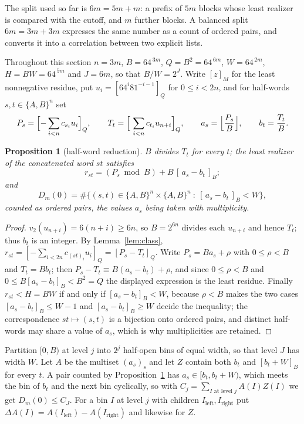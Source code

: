 \documentclass[11pt,a4paper]{article}
\theoremstyle{plain}
\newtheorem{proposition}[theorem]{Proposition}
\theoremstyle{definition}
\theoremstyle{remark}
\begin{document}
The split used so far is $6m=5m+m$: a prefix of $5m$ blocks whose least
realizer is compared with the cutoff, and $m$ further blocks. A balanced split
$6m=3m+3m$ expresses the same number as a count of ordered pairs, and converts
it into a correlation between two explicit lists.

Throughout this section $n=3m$, $B=64^{\,3m}$, $Q=B^{2}=64^{\,6m}$,
$W=64^{\,2m}$, $H=BW=64^{\,5m}$ and $J=6m$, so that $B/W=2^{J}$. Write
$[z]_M$ for the least nonnegative residue, put $u_i=[64^{i}81^{-i-1}]_Q$ for
$0\le i<2n$, and for half-words $s,t\in\{A,B\}^{n}$ set
\[
P_s=\Bigl[-\sum_{i<n}c_{s_i}u_i\Bigr]_Q,\qquad
T_t=\Bigl[\ \sum_{i<n}c_{t_i}u_{n+i}\Bigr]_Q,\qquad
a_s=\Bigl\lfloor \frac{P_s}{B}\Bigr\rfloor,\qquad b_t=\frac{T_t}{B}.
\]

\begin{proposition}[half-word reduction]\label{prop:halfword}
$B$ divides $T_t$ for every $t$; the least realizer of the concatenated word
$st$ satisfies
\[
r_{st}=(P_s\bmod B)+B\,[\,a_s-b_t\,]_B ;
\]
and
\[
D_m(0)=\#\bigl\{(s,t)\in\{A,B\}^{n}\times\{A,B\}^{n}\ :\ [\,a_s-b_t\,]_B<W\bigr\},
\]
counted as ordered pairs, the values $a_s$ being taken with multiplicity.
\end{proposition}

\begin{proof}
$v_2(u_{n+i})=6(n+i)\ge6n$, so $B=2^{6n}$ divides each $u_{n+i}$ and hence
$T_t$; thus $b_t$ is an integer. By Lemma~\ref{lem:class},
$r_{st}=[-\sum_{i<2n}c_{(st)_i}u_i]_Q=[P_s-T_t]_Q$. Write $P_s=Ba_s+\rho$ with
$0\le\rho<B$ and $T_t=Bb_t$; then $P_s-T_t\equiv B(a_s-b_t)+\rho$, and since
$0\le\rho<B$ and $0\le B[a_s-b_t]_B<B^{2}=Q$ the displayed expression is the
least residue. Finally $r_{st}<H=BW$ if and only if $[a_s-b_t]_B<W$, because
$\rho<B$ makes the two cases $[a_s-b_t]_B\le W-1$ and $[a_s-b_t]_B\ge W$
decide the inequality; the correspondence $st\mapsto(s,t)$ is a bijection onto
ordered pairs, and distinct half-words may share a value of $a_s$, which is why
multiplicities are retained.
\end{proof}

Partition $[0,B)$ at level $j$ into $2^{j}$ half-open bins of equal width, so
that level $J$ has width $W$. Let $A$ be the multiset $(a_s)_s$ and let $Z$
contain both $b_t$ and $[b_t+W]_B$ for every $t$. A pair counted by
Proposition~\ref{prop:halfword} has $a_s\in[b_t,b_t+W)$, which meets the bin of
$b_t$ and the next bin cyclically, so with
$C_j=\sum_{I\text{ at level }j}A(I)Z(I)$ we get $D_m(0)\le C_J$. For a bin $I$
at level $j$ with children $I_{\mathrm{left}},I_{\mathrm{right}}$ put
$\Delta A(I)=A(I_{\mathrm{left}})-A(I_{\mathrm{right}})$ and likewise for $Z$.
\end{document}
